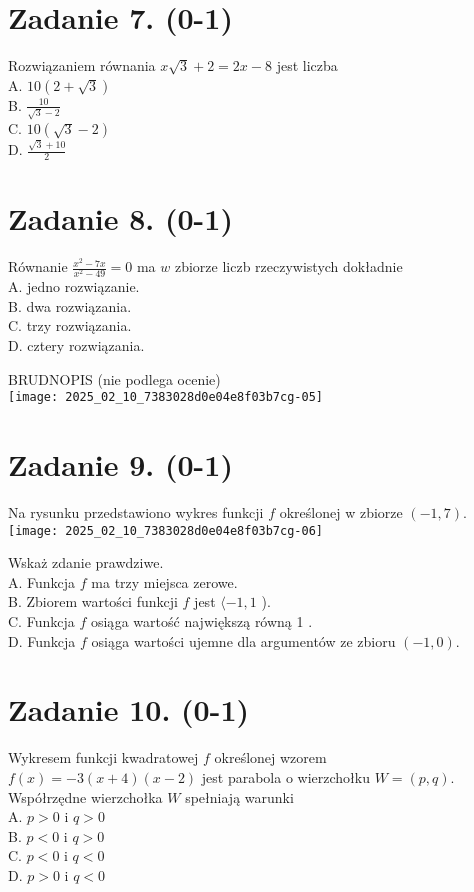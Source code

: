 \documentclass[10pt]{article}
\begin{document}
\section*{Zadanie 7. (0-1)}
Rozwiązaniem równania \(x \sqrt{3}+2=2 x-8\) jest liczba\\
A. \(10(2+\sqrt{3})\)\\
B. \(\frac{10}{\sqrt{3}-2}\)\\
C. \(10(\sqrt{3}-2)\)\\
D. \(\frac{\sqrt{3}+10}{2}\)

\section*{Zadanie 8. (0-1)}
Równanie \(\frac{x^{2}-7 x}{x^{2}-49}=0\) ma \(w\) zbiorze liczb rzeczywistych dokładnie\\
A. jedno rozwiązanie.\\
B. dwa rozwiązania.\\
C. trzy rozwiązania.\\
D. cztery rozwiązania.

BRUDNOPIS (nie podlega ocenie)\\
\texttt{[image: 2025\_02\_10\_7383028d0e04e8f03b7cg-05]}

\section*{Zadanie 9. (0-1)}
Na rysunku przedstawiono wykres funkcji \(f\) określonej w zbiorze \((-1,7)\).\\
\texttt{[image: 2025\_02\_10\_7383028d0e04e8f03b7cg-06]}

Wskaż zdanie prawdziwe.\\
A. Funkcja \(f\) ma trzy miejsca zerowe.\\
B. Zbiorem wartości funkcji \(f\) jest \(\langle-1,1\) ).\\
C. Funkcja \(f\) osiąga wartość największą równą 1 .\\
D. Funkcja \(f\) osiąga wartości ujemne dla argumentów ze zbioru \((-1,0)\).

\section*{Zadanie 10. (0-1)}
Wykresem funkcji kwadratowej \(f\) określonej wzorem \(f(x)=-3(x+4)(x-2)\) jest parabola o wierzchołku \(W=(p, q)\). Współrzędne wierzchołka \(W\) spełniają warunki\\
A. \(p>0\) i \(q>0\)\\
B. \(p<0\) i \(q>0\)\\
C. \(p<0\) i \(q<0\)\\
D. \(p>0\) i \(q<0\)
\end{document}
